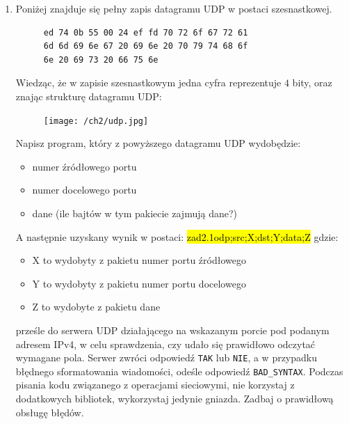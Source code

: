 \documentclass{article}
\newcommand{\hlc}[2][shadecolor]{ 	{\sethlcolor{#1} \hl{#2}} }
\begin{document}
\begin{enumerate}[label=\textbf{2.\arabic*}]\setlength{\itemsep}{1em}
    \item \label{ex21} Poniżej znajduje się pełny zapis datagramu UDP w postaci szesnastkowej. \\

\begin{figure}[h!t!p!]
\centering
\begin{BVerbatim}
ed 74 0b 55 00 24 ef fd 70 72 6f 67 72 61
6d 6d 69 6e 67 20 69 6e 20 70 79 74 68 6f 
6e 20 69 73 20 66 75 6e
\end{BVerbatim}
\end{figure}

\noindent  Wiedząc, że w zapisie szesnastkowym jedna cyfra reprezentuje $4$ bity, oraz znając strukturę datagramu UDP: 

\begin{figure}[ht!]
\centering
\texttt{[image: /ch2/udp.jpg]}
\end{figure}

\noindent Napisz program, który z powyższego datagramu UDP wydobędzie: 

\begin{itemize}
\item numer źródłowego portu
\item numer docelowego portu
\item dane (ile bajtów w tym pakiecie zajmują dane?)
\end{itemize}

\noindent A następnie uzyskany wynik w postaci: \hlc[shadecolor]{ zad2.1odp;src;X;dst;Y;data;Z } gdzie:

\begin{itemize}
\item X to wydobyty z pakietu numer portu źródłowego
\item Y to wydobyty z pakietu numer portu docelowego
\item Z to wydobyte z pakietu dane 
\end{itemize}

 prześle do serwera UDP działającego na wskazanym porcie pod podanym adresem IPv4, w celu sprawdzenia, czy udało się prawidłowo odczytać wymagane pola. Serwer zwróci odpowiedź \texttt{TAK} lub \texttt{NIE}, a w przypadku błędnego sformatowania wiadomości, odeśle odpowiedź \texttt{BAD\_SYNTAX}.  Podczas pisania kodu związanego z operacjami sieciowymi, nie korzystaj z dodatkowych bibliotek, wykorzystaj jedynie gniazda. Zadbaj o prawidłową obsługę błędów. 


\end{enumerate}
\end{document}
